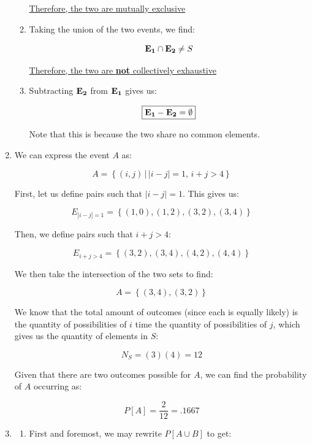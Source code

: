 \begin{enumerate}
\begin{enumerate}
        \underline{Therefore, the two are mutually exclusive}

      \item Taking the union of the two events, we find:

        $$\bold{E_1}\cap\bold{E_2}\neq S$$

        \underline{Therefore, the two are \textbf{not} collectively exhaustive}

      \item Subtracting $\bold{E_2}$ from $\bold{E_1}$ gives us:

        $$\boxed{\bold{E_1}-\bold{E_2}=\emptyset}$$

        Note that this is because the two share no common elements.

    \end{enumerate}

    \setcounter{enumi}{3}

  \item We can express the event $A$ as:

    $$A=\left\{ (i,j)\,\Big|\,|i-j|=1,\, i+j>4 \right\}$$

    First, let us define pairs such that $|i-j|=1$. This gives us:

    $$E_{|i-j|=1}=\left\{(1,0),(1,2),(3,2),(3,4)  \right\}$$

    Then, we define pairs such that $i+j>4$:

    $$E_{i+j>4}=\left\{(3,2),(3,4),(4,2),(4,4)  \right\}$$

    We then take the intersection of the two sets to find:

    $$\boxed{A=\left\{ (3,4),(3,2) \right\}}$$

    We know that the total amount of outcomes (since each is equally likely) is the quantity of possibilities of $i$ time the quantity of possibilities of $j$, which gives us the quantity of elements in $S$:

    $$N_S=(3)(4)=12$$

    Given that there are two outcomes possible for $A$, we can find the probability of $A$ occurring as:

    $$\boxed{P[A]=\frac{2}{12}=.1667}$$

  \item 

    \begin{enumerate}

      \item First and foremost, we may rewrite $P[A\cup B]$ to get:


\end{enumerate}
\end{enumerate}
